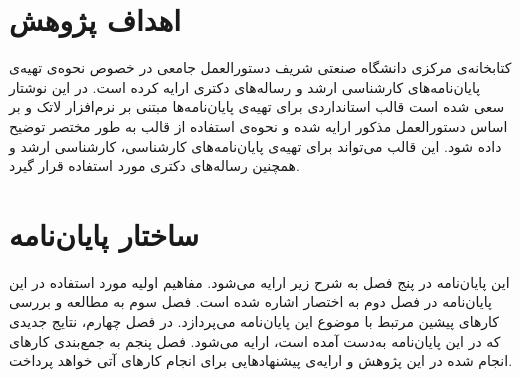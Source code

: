 \section{اهداف پژوهش}
کتابخانه‌ی مرکزی دانشگاه صنعتی شریف دستورالعمل جامعی در خصوص نحوه‌ی تهیه‌ی پایان‌نامه‌ها‌ی کارشناسی ارشد و رساله‌های دکتری ارایه کرده است. در این نوشتار سعی شده است قالب استانداردی برای تهیه‌ی پایان‌نامه‌ها مبتنی بر نرم‌افزار لاتک و بر اساس دستورالعمل مذکور ارایه شده و نحوه‌ی استفاده از قالب به طور مختصر توضیح داده شود. این قالب  می‌تواند برای تهیه‌ی پایان‌نامه‌های کارشناسی، کارشناسی ارشد و همچنین رساله‌ها‌ی دکتری مورد استفاده قرار گیرد.


\section{ساختار پایان‌نامه}
این پایان‌نامه در پنج فصل به شرح زیر ارایه می‌شود. مفاهیم اولیه مورد استفاده در این پایان‌نامه در فصل دوم به اختصار اشاره شده است. فصل سوم به مطالعه و بررسی کارهای پیشین مرتبط با موضوع این پایان‌نامه می‌پردازد. در فصل چهارم، نتایج جدیدی که در این پایان‌نامه به‌دست آمده است، ارایه می‌شود. فصل پنجم به جمع‌بندی کارهای انجام شده در این پژوهش و ارایه‌ی پیشنهادهایی برای انجام کارهای آتی خواهد پرداخت.
